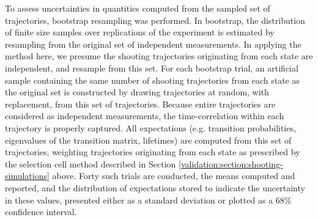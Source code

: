 To assess uncertainties in quantities computed from the sampled set of trajectories, bootstrap resampling was performed.  
In bootstrap, the distribution of finite size samples over replications of the experiment is estimated by resampling from the original set of independent measurements.  
In applying the method here, we presume the shooting trajectories originating from each state are independent, and resample from this set.  
For each bootstrap trial, an artificial sample containing the same number of shooting trajectories from each state as the original set is constructed by drawing trajectories at random, with replacement, from this set of trajectories.
Because entire trajectories are considered as independent measurements, the time-correlation within each trajectory is properly captured.
All expectations (e.g. transition probabilities, eigenvalues of the transition matrix, lifetimes) are computed from this set of trajectories, weighting trajectories originating from each state as prescribed by the selection cell method described in Section \ref{validation:section:shooting-simulations} above. 
Forty such trials are conducted, the means computed and reported, and the distribution of expectations stored to indicate the uncertainty in these values, presented either as a standard deviation or plotted as a 68\% confidence interval. 







